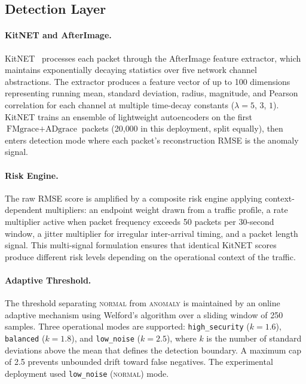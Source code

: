 \documentclass[preprint,12pt,authoryear]{elsarticle}
\begin{document}
\subsection{Detection Layer}
\label{subsec:detection}

\paragraph{KitNET and AfterImage.}
KitNET~\citep{Mirsky2018} processes each packet through the AfterImage feature
extractor, which maintains exponentially decaying statistics over five network
channel abstractions. The extractor produces a feature vector of up to 100
dimensions representing running mean, standard deviation, radius, magnitude, and
Pearson correlation for each channel at multiple time-decay constants
($\lambda = 5$, $3$, $1$). KitNET trains an ensemble of lightweight autoencoders
on the first $\text{FMgrace} + \text{ADgrace}$ packets (20{,}000 in this
deployment, split equally), then enters detection mode where each packet's
reconstruction RMSE is the anomaly signal.

\paragraph{Risk Engine.}
The raw RMSE score is amplified by a composite risk engine applying
context-dependent multipliers: an endpoint weight drawn from a traffic profile,
a rate multiplier active when packet frequency exceeds 50 packets per 30-second
window, a jitter multiplier for irregular inter-arrival timing, and a packet
length signal. This multi-signal formulation ensures that identical KitNET scores
produce different risk levels depending on the operational context of the
traffic.

\paragraph{Adaptive Threshold.}
The threshold separating \textsc{normal} from \textsc{anomaly} is maintained by
an online adaptive mechanism using Welford's algorithm over a sliding window of
250 samples. Three operational modes are supported: \texttt{high\_security}
($k = 1.6$), \texttt{balanced} ($k = 1.8$), and \texttt{low\_noise} ($k = 2.5$),
where $k$ is the number of standard deviations above the mean that defines the
detection boundary. A maximum cap of 2.5 prevents unbounded drift toward false
negatives. The experimental deployment used \texttt{low\_noise} (\textsc{normal})
mode.
\end{document}
